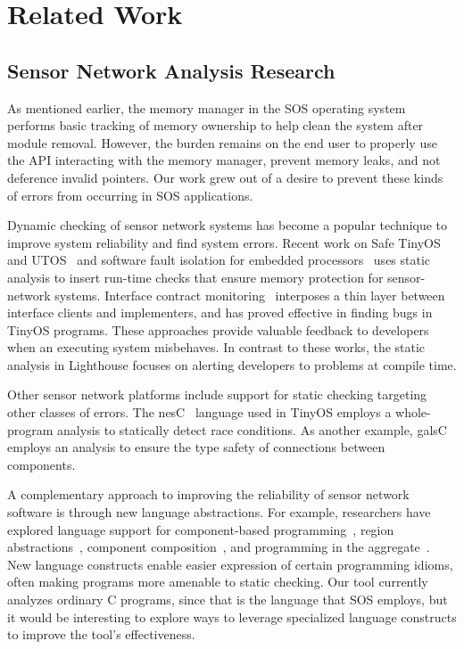 \section{Related Work}
\label{sec:related}

\subsection{Sensor Network Analysis Research}

As mentioned earlier, the memory manager in the SOS operating
system~\cite{sos} performs basic tracking of memory ownership to help
clean the system after module removal.
%
However, the burden remains on the end user to properly use the API
interacting with the memory manager, prevent memory leaks, and not
deference invalid pointers.
%
Our work grew out of a desire to prevent these kinds of errors from
occurring in SOS applications.



Dynamic checking of sensor network systems has become a popular technique to
improve system reliability and find system errors.
%
Recent work on Safe TinyOS and UTOS~\cite{regehr06memory} and software fault
isolation for embedded processors~\cite{kumar07system} uses static analysis
to insert run-time checks that ensure memory protection for sensor-network
systems.
%
Interface contract monitoring~\cite{archer07interface} interposes a thin
layer between interface clients and implementers, and has proved effective
in finding bugs in TinyOS programs.
%
These approaches provide valuable feedback to developers when an executing
system misbehaves.
%
In contrast to these works, the static analysis in Lighthouse focuses on
alerting developers to problems at compile time.



Other sensor network platforms include support for static checking targeting
other classes of errors.  
%
The nesC~\cite{nesC} language used in TinyOS employs a whole-program
analysis to statically detect race conditions.  
%
As another example, galsC~\cite{TinyGALS,galsC} employs an analysis to
ensure the type safety of connections between components.  



A complementary approach to improving the reliability of sensor network
software is through new language abstractions.  
%
For example, researchers have explored language support for component-based
programming~\cite{TinyOS,nesC,galsC}, region
abstractions~\cite{conf/mobisys/WhitehouseSCB04,conf/nsdi/WelshM04},
component composition~\cite{conf/sensys/GreensteinKE04}, and programming in
the aggregate~\cite{1052213,conf/dcoss/GummadiGG05}.
%
New language constructs enable easier expression of certain programming
idioms, often making programs more amenable to static checking.  
%
Our tool currently analyzes ordinary C programs, since that is the language
that SOS employs, but it would be interesting to explore ways to leverage
specialized language constructs to improve the tool's effectiveness.



